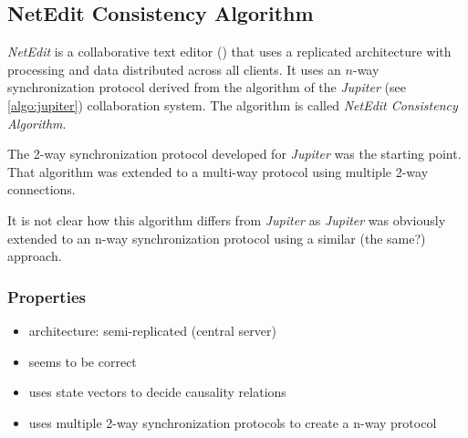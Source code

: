 \subsection{NetEdit Consistency Algorithm}
\label{algo:netedit}

\emph{NetEdit} is a collaborative text editor (\cite{netedit}) that uses a replicated architecture with processing and data distributed across all clients. It uses an $n$-way synchronization protocol derived from the algorithm of the \emph{Jupiter} (see \ref{algo:jupiter}) collaboration system. The algorithm is called \emph{NetEdit Consistency Algorithm}.

The 2-way synchronization protocol developed for \emph{Jupiter} was the starting point. That algorithm was extended to a multi-way protocol using multiple 2-way connections. 



It is not clear how this algorithm differs from \emph{Jupiter} as \emph{Jupiter} was obviously extended to an n-way synchronization protocol using a similar (the same?) approach.


\subsubsection{Properties}
\begin{itemize}
 \item architecture: semi-replicated (central server)
 \item seems to be correct
 \item uses state vectors to decide causality relations
 \item uses multiple 2-way synchronization protocols to create a n-way protocol
\end{itemize}


